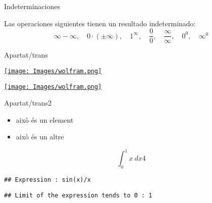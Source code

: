 \documentclass[ignorenonframetext,]{beamer}
\providecommand{\tightlist}{%
  \setlength{\itemsep}{0pt}\setlength{\parskip}{0pt}}
\begin{document}
\begin{frame}{Indeterminaciones}
\protect\hypertarget{indeterminaciones}{}

Las operaciones siguientes tienen un resultado indeterminado: \[
\infty - \infty, \quad 0\cdot (\pm \infty), \quad 1^{\infty}, \quad \frac{0}{0}, \quad  \frac{\infty}{\infty}, \quad 0^0, \quad  \infty^0
\]

\end{frame}

\begin{frame}{Apartat/trans}
\protect\hypertarget{apartattrans}{}

\href{https://www.wolframalpha.com/input/?i=taylor+series+arctan\%281\%2F\%281\%2Bx\%5E6\%29\%29+at+x+\%3D+pi\%2F4}{\texttt{[image: Images/wolfram.png]}}

\href{https://www.wolframalpha.com/input/?i=6\%2F7+with+48+decimals}{\texttt{[image: Images/wolfram.png]}}

\end{frame}

\begin{frame}[fragile]{Apartat/trans2}
\protect\hypertarget{apartattrans2}{}

\begin{itemize}
\tightlist
\item
  això és un element
\item
  això és un altre
\end{itemize}

\[\int_0^1 x\ dx 4\]

\begin{verbatim}
## Expression : sin(x)/x
\end{verbatim}

\begin{verbatim}
## Limit of the expression tends to 0 : 1
\end{verbatim}

\end{frame}
\end{document}
